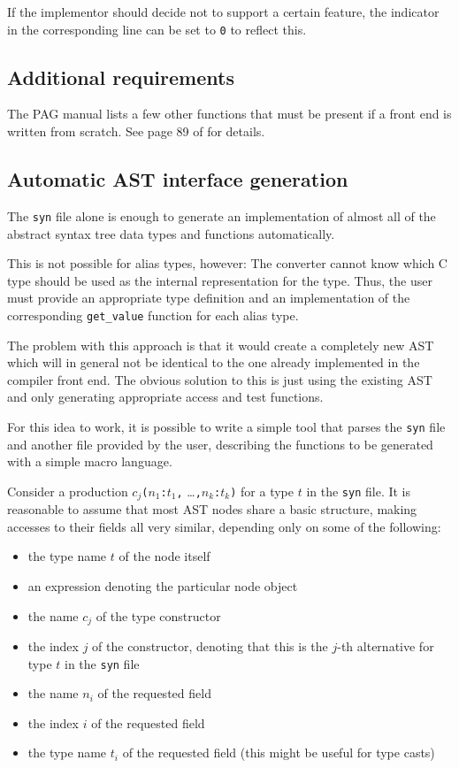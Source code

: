 \documentclass[12pt]{article}
\begin{document}
If the implementor should decide not to support a certain feature,
the indicator in the corresponding line can be set to \verb|0| to
reflect this.

\subsection{Additional requirements}

The PAG manual lists a few other functions that must be present if a
front end is written from scratch. See page 89 of \cite{pag} for
details.

\subsection{Automatic AST interface generation}

The \verb|syn| file alone is enough to generate an implementation of
almost all of the abstract syntax tree data types and functions
automatically.

This is not possible for alias types, however: The converter cannot
know which C type should be used as the internal representation for
the type. Thus, the user must provide an appropriate type definition
and an implementation of the corresponding \verb|get_value| function
for each alias type.

The problem with this approach is that it would create a completely
new AST which will in general not be identical to the one already
implemented in the compiler front end. The obvious solution to this
is just using the existing AST and only generating appropriate
access and test functions.

For this idea to work, it is possible to write a simple tool that
parses the \verb|syn| file and another file provided by the user,
describing the functions to be generated with a simple macro
language.

Consider a production \(c_j\)\verb|(|\(n_1\)\verb|:|\(t_1\)\verb|,|
\ldots\verb|,|\(n_k\)\verb|:|\(t_k\)\verb|)| for a type \(t\) in the
\verb|syn| file. It is reasonable to assume that most AST nodes
share a basic structure, making accesses to their fields all very
similar, depending only on some of the following:

\begin{itemize}
\item the type name \(t\) of the node itself
\item an expression denoting the particular node object
\item the name \(c_j\) of the type constructor
\item the index \(j\) of the constructor, denoting that this is the
    \(j\)-th alternative for type \(t\) in the \verb|syn| file
\item the name \(n_i\) of the requested field
\item the index \(i\) of the requested field
\item the type name \(t_i\) of the requested field (this might be
    useful for type casts)
\end{itemize}
\end{document}
